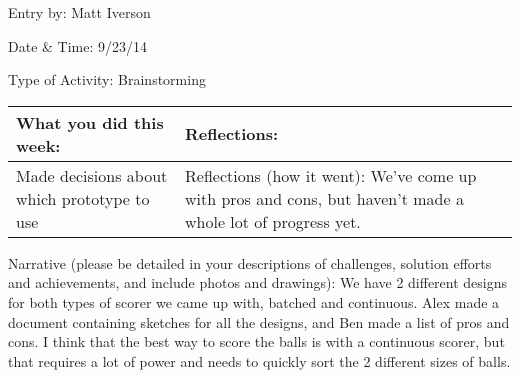 Entry by: Matt Iverson

Date & Time: 9/23/14

Type of Activity: Brainstorming

\begin{tabular}{|p{5cm}|p{5cm}|}
 \hline
 What you did this week: &
 Reflections: \\
 \hline
 Made decisions about which prototype to use &
 Reflections (how it went): We’ve come up with pros and cons, but haven’t made a whole lot of progress yet. \\
 \hline
\end{tabular}

Narrative (please be detailed in your descriptions of challenges, solution efforts and achievements, and include photos and drawings): We have 2 different designs for both types of scorer we came up with, batched and continuous. Alex made a document containing sketches for all the designs, and Ben made a list of pros and cons. I think that the best way to score the balls is with a continuous scorer, but that requires a lot of power and needs to quickly sort the 2 different sizes of balls.
